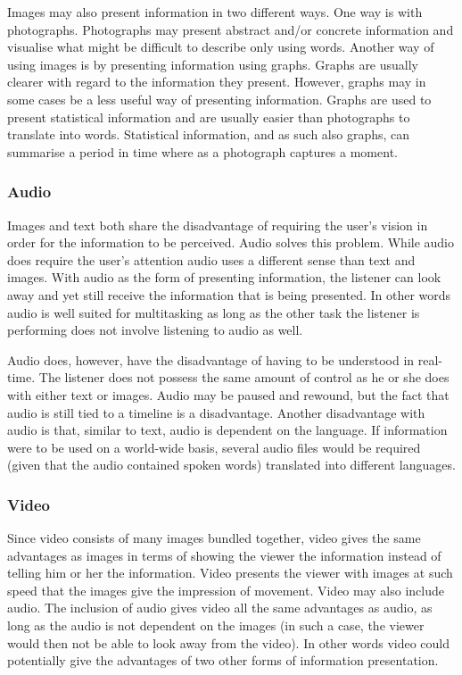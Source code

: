 Images may also present information in two different ways. One way is with photographs. Photographs may present abstract and/or concrete information and visualise what might be difficult to describe only using words. Another way of using images is by presenting information using graphs. Graphs are usually clearer with regard to the information they present. However, graphs may in some cases be a less useful way of presenting information. Graphs are used to present statistical information and are usually easier than photographs to translate into words. Statistical information, and as such also graphs, can summarise a period in time where as a photograph captures a moment. 

\subsubsection{Audio}
Images and text both share the disadvantage of requiring the user's vision in order for the information to be perceived. Audio solves this problem. While audio does require the user's attention audio uses a different sense than text and images. With audio as the form of presenting information, the listener can look away and yet still receive the information that is being presented. In other words audio is well suited for multitasking as long as the other task the listener is performing does not involve listening to audio as well.

Audio does, however, have the disadvantage of having to be understood in real-time. The listener does not possess the same amount of control as he or she does with either text or images. Audio may be paused and rewound, but the fact that audio is still tied to a timeline is a disadvantage. Another disadvantage with audio is that, similar to text, audio is dependent on the language. If information were to be used on a world-wide basis, several audio files would be required (given that the audio contained spoken words) translated into different languages.

\subsubsection{Video}
Since video consists of many images bundled together, video gives the same advantages as images in terms of showing the viewer the information instead of telling him or her the information. Video presents the viewer with images at such speed that the images give the impression of movement. Video may also include audio. The inclusion of audio gives video all the same advantages as audio, as long as the audio is not dependent on the images (in such a case, the viewer would then not be able to look away from the video). In other words video could potentially give the advantages of two other forms of information presentation.

